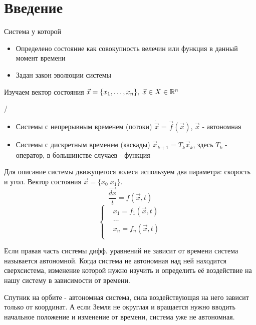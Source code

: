 \documentclass{article}
\begin{document}

\section{Введение}
\begin{definition}
  Система у которой
  \begin{itemize}
    \item Определено состояние как совокупность велечин или функция в данный момент времени
    \item Задан закон эволюции системы
  \end{itemize} 
  Изучаем вектор состояния $\vec{x}=\{x_1,\dots,x_n\}, \; \vec{x}\in X\in \mathbb{R}^n$
\end{definition}
\begin{definition} /
  \begin{itemize}
    \item Системы с непрерывным временем (потоки) $\dot{\vec{x}}=\vec{f}(\vec{x})$, $\vec{x}$ - автономная
    \item Системы с дискретным временем (каскады) $\vec{x}_{k+1}=T_k \vec{x}_k$,
      здесь $T_k$ - оператор, в большинстве случаев - функция
  \end{itemize}
\end{definition}
\begin{eg}
  Для описание системы движущегося колеса используем два параметра: скорость и угол. 
  Вектор состояния $\vec{x}=\{x_0 \; x_1\}$.
  \[
    \frac{\vec{dx}}{t}=f(\vec{x},t)
  \]
  \[
    \left\{\begin{aligned}
        & x_1= f_1(\vec{x},t)  \\
        & \dots  \\
        & x_n= f_n(\vec{x},t)  \\
    \end{aligned}\right.
  \]
\end{eg}
\begin{definition}
  Если правая часть системы дифф. уравнений не зависит от времени система называется автономной. 
  Когда система не автономная над ней находится сверхсистема,
  изменение которой нужно изучить и определить её воздействие на нашу систему в зависимости от времени.
\end{definition}
\begin{eg}
  Спутник на орбите - автономная система, сила воздействующая на него зависит только от координат.
  А если Земля не округлая и вращается нужно вводить начальное положение и изменение от времени, система уже не автономная.
\end{eg}
\end{document}
